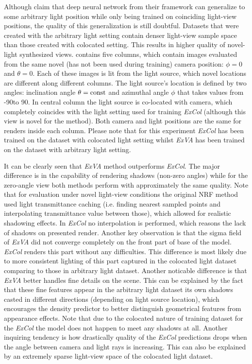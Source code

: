 Although \cite{bi2020neural} claim that deep neural network from their framework
can generalize to some arbitrary light position while only being trained on coinciding light-view positions,
the quality of this generalization is still doubtful.
Datasets that were created with the arbitrary light setting
contain denser light-view sample space than those created with colocated setting.
This results in higher quality of novel-light synthesized views.
 contains five columns,
which contain images evaluated from the same novel (has not been used during training) camera position: $\phi = 0$ and $\theta = 0$.
Each of these images is lit from the light source,
which novel locations are different along different columns.
The light source's location is defined by two angles:
inclination angle $\theta = \mathrm{const}$ and azimuthal angle $\phi$
that takes values from -90\textdegree to 90\textdegree.
In central column the light source is co-located with camera,
which completely coincides with the light setting used for training \textit{ExCol}
(although this view is novel for the method).
Both camera and light positions are the same for renders inside each column.
Please note that for this experiment \textit{ExCol} has been trained on the dataset with colocated light setting
whilst \textit{ExVA} has been trained on the dataset with arbitrary light setting.


It can be clearly seen that \textit{ExVA} method outperforms \textit{ExCol}.
The major difference is in the capability of rendering shadows (non-zero angles)
while for the zero-angle view both methods perform with approximately the same quality.
Note that for evaluation under novel light-view conditions the original NRF method used light transmittance caching
(i.e. finding nearest sampled points and interpolating transmittance value between those),
which allowed for realistic shadowing effects.
In \textit{ExCol} no interpolation is performed, which reasons the lack of shadows on presented render.
Another key observation is that the sigma field of \textit{ExVA} did not converge completely on the front part of base of the model.
\textit{ExCol} renders this part without any difficulties.
This difference is most likely due to more consistent lighting of this part
captured in the colocated light dataset comparing to those in arbitrary light dataset.
Another noticable difference is that \textit{ExVA} better handles fine details on the scene.
This can be explained by the fact that these fine features appear
in the arbitrary light dataset its own shadows casted in different directions (depending on light source location),
which encourages the density predictor to better distinguish geometrical features from appearance effects.
Note that due to the colocated nature of training dataset for the \textit{ExCol}
the model does not happen to meet any shadows at all.
Another inquiring tendency is how drastically quality of the \textit{ExCol} predictions drops
when the angle between camera and light rays is increasing.
This can also be explained by an extremely sparse light-view space of the colocated light dataset.



